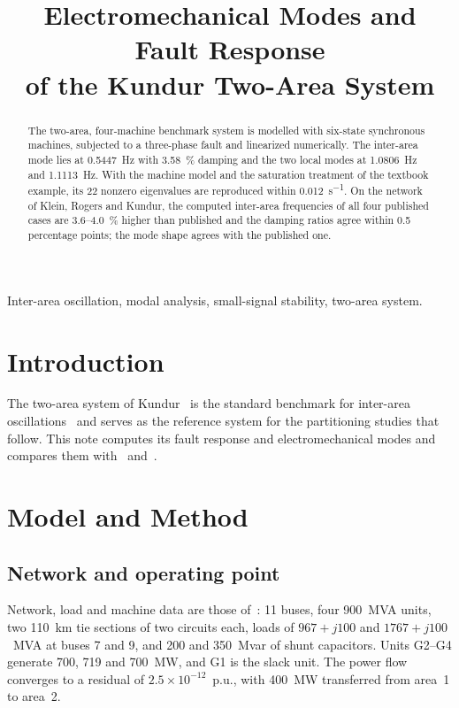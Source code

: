 \documentclass[conference]{IEEEtran}
\begin{document}
\title{Electromechanical Modes and Fault Response\\of the Kundur Two-Area System}
\author{
}
\maketitle

\begin{abstract}
The two-area, four-machine benchmark system is modelled with six-state synchronous machines, subjected to a three-phase fault and linearized numerically. The inter-area mode lies at \SI{0.5447}{Hz} with \SI{3.58}{\percent} damping and the two local modes at \SI{1.0806}{Hz} and \SI{1.1113}{Hz}. With the machine model and the saturation treatment of the textbook example, its 22 nonzero eigenvalues are reproduced within \SI{0.012}{s^{-1}}. On the network of Klein, Rogers and Kundur, the computed inter-area frequencies of all four published cases are 3.6--\SI{4.0}{\percent} higher than published and the damping ratios agree within 0.5 percentage points; the mode shape agrees with the published one.
\end{abstract}
\begin{IEEEkeywords}
Inter-area oscillation, modal analysis, small-signal stability, two-area system.
\end{IEEEkeywords}

\section{Introduction}
The two-area system of Kundur~\cite{kundur} is the standard benchmark for inter-area oscillations~\cite{klein} and serves as the reference system for the partitioning studies that follow. This note computes its fault response and electromechanical modes and compares them with~\cite{kundur} and~\cite{klein}.

\section{Model and Method}
\subsection{Network and operating point}
Network, load and machine data are those of~\cite[Example 12.6]{kundur}: 11 buses, four \SI{900}{MVA} units, two \SI{110}{km} tie sections of two circuits each, loads of $967+j100$ and $1767+j100$~MVA at buses 7 and 9, and 200 and \SI{350}{Mvar} of shunt capacitors. Units G2--G4 generate 700, 719 and \SI{700}{MW}, and G1 is the slack unit. The power flow converges to a residual of $2.5\times10^{-12}$~p.u., with \SI{400}{MW} transferred from area~1 to area~2.
\end{document}
